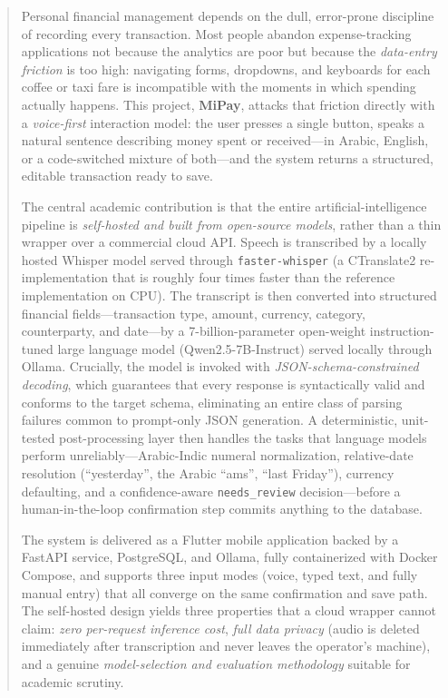 \begin{abstract}
\noindent
Personal financial management depends on the dull, error-prone discipline of
recording every transaction. Most people abandon expense-tracking applications
not because the analytics are poor but because the \emph{data-entry friction} is
too high: navigating forms, dropdowns, and keyboards for each coffee or taxi
fare is incompatible with the moments in which spending actually happens. This
project, \textbf{MiPay}, attacks that friction directly with a
\emph{voice-first} interaction model: the user presses a single button, speaks a
natural sentence describing money spent or received---in Arabic, English, or a
code-switched mixture of both---and the system returns a structured, editable
transaction ready to save.

The central academic contribution is that the entire artificial-intelligence
pipeline is \emph{self-hosted and built from open-source models}, rather than a
thin wrapper over a commercial cloud API. Speech is transcribed by a locally
hosted Whisper model served through \texttt{faster-whisper} (a CTranslate2
re-implementation that is roughly four times faster than the reference
implementation on CPU). The transcript is then converted into structured
financial fields---transaction type, amount, currency, category, counterparty,
and date---by a 7-billion-parameter open-weight instruction-tuned large language
model (Qwen2.5-7B-Instruct) served locally through Ollama. Crucially, the model
is invoked with \emph{JSON-schema-constrained decoding}, which guarantees that
every response is syntactically valid and conforms to the target schema,
eliminating an entire class of parsing failures common to prompt-only JSON
generation. A deterministic, unit-tested post-processing layer then handles the
tasks that language models perform unreliably---Arabic-Indic numeral
normalization, relative-date resolution (``yesterday'', the Arabic ``ams'',
``last Friday''), currency defaulting, and a confidence-aware
\texttt{needs\_review} decision---before a human-in-the-loop confirmation step
commits anything to the database.

The system is delivered as a Flutter mobile application backed by a FastAPI
service, PostgreSQL, and Ollama, fully containerized with Docker Compose, and
supports three input modes (voice, typed text, and fully manual entry) that all
converge on the same confirmation and save path. The self-hosted design yields
three properties that a cloud wrapper cannot claim: \emph{zero per-request
inference cost}, \emph{full data privacy} (audio is deleted immediately after
transcription and never leaves the operator's machine), and a genuine
\emph{model-selection and evaluation methodology} suitable for academic scrutiny.


\end{abstract}
